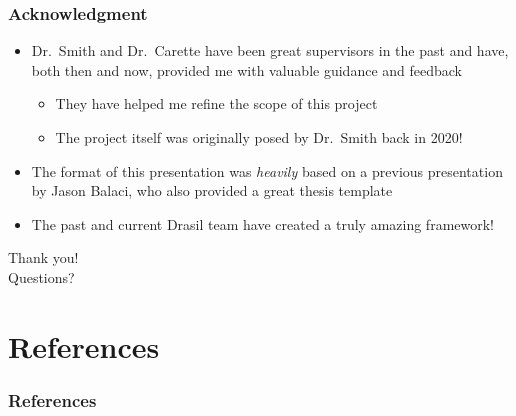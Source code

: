 \documentclass{beamer}
\begin{document}

\begin{frame}
    \frametitle{Acknowledgment}

    \begin{itemize}
        \item Dr.~Smith and Dr.~Carette have been great supervisors in the
              past and have, both then and now, provided me with valuable guidance
              and feedback
              \begin{itemize}
                  \item They have helped me refine the scope of this project
                  \item The project itself was originally posed by Dr.~Smith back
                        in 2020!
              \end{itemize}
        \item<2-> The format of this presentation was \emph{heavily} based on
              a previous presentation by Jason Balaci, who also provided a
              great thesis template
        \item<3-> The past and current Drasil team have created a truly amazing
              framework!
    \end{itemize}
\end{frame}


\begin{frame}
    \center
    \huge{Thank you!}\\
    \normalsize{Questions?}
\end{frame}


\section{References}

\begin{frame}%
    \frametitle{References}

    
\end{frame}
\end{document}
